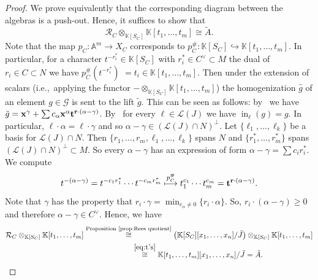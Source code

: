 \documentclass[pdftex]{sigma}%
\numberwithin{equation}{section}
\DeclareMathOperator{\init}{in}
\begin{document}
\begin{proof}
We prove equivalently that the corresponding diagram between the algebras is a push-out.
Hence, it suffices to show that
\begin{equation*}%
\mathcal R_C\otimes_{\mathbb K[S_C]} \mathbb K[t_1,\dots,t_m]\cong \tilde A.
\end{equation*}
Note that the map $p_C\colon \mathbb A^m \to X_C$ corresponds to $p_C^\#\colon \mathbb K[S_C] {\hookrightarrow} \mathbb K[t_1,\dots,t_m]$.
In particular, for a character $t^{-r_i^*}\in \mathbb K[S_C]$ with $r_i^*\in C^\vee\subset M$ the dual of $r_i\in C\subset N$ we have $p_C^\#(t^{-r_i^*})$ $=t_i\in \mathbb K[t_1,\dots,t_m]$.
Then under the extension of scalars (i.e.,~applying the functor $-\otimes_{\mathbb K[S_C]}\mathbb K[t_1,\dots,t_m]$) the homogenization $\hat g$ of an element $g\in \mathcal G$ is sent to the lift $\tilde g$.
This can be seen as follows:
by~ we have
$\tilde g={\bf x}^\gamma + \sum c_\alpha{\bf x}^\alpha{\bf t}^{{\bf r}\cdot(\alpha-\gamma)}$.
By~ for every $\ell\in \mathcal L(J)$ we have $\init_{\ell}(g)=g$.
In particular, $\ell\cdot \alpha=\ell\cdot \gamma$ and so $\alpha-\gamma\in (\mathcal L(J)\cap N)^\perp$.
Let $\{\ell_1,\dots,\ell_{k}\}$ be a basis for $\mathcal L(J)\cap N$.
Then $\{r_1,\dots,r_m,\ell_1,\dots,\ell_{k}\}$ spans $N$ and $\{r_1^*,\dots,r_m^*\}$ spans $(\mathcal L(J)\cap N)^\perp\subset M$.
So every $\alpha-\gamma$ has an expression of form $\alpha-\gamma=\sum c_ir_i^*$.
We compute
\begin{equation}\label{eq:t's}
t^{-(\alpha-\gamma)}=t^{-c_1r_1^*}\cdots t^{-c_mr_m^*} \overset{p_C^\#}{\longmapsto} t_1^{c_1}\cdots t_m^{c_m}={\bf t}^{{\bf r}\cdot(\alpha-\gamma)}.
\end{equation}
Note that $\gamma$ has the property that $r_i\cdot\gamma
=\min_{c_\alpha \not=0}\{r_i\cdot\alpha\}$.
So, $r_i\cdot(\alpha-\gamma)\ge 0$ and therefore $\alpha-\gamma\in C^\vee$.
Hence, we have
\begin{gather*}
\mathcal R_C\otimes_{\mathbb K[S_C]} \mathbb K[t_1,\dots,t_m]
\overset{\text{{Proposition}~\ref{prop:Rees quotient}}}{\cong}
\big(\mathbb K[S_C][x_1,\dots,x_n]/\hat J \big)\otimes_{\mathbb K[S_C]} \mathbb K[t_1,\dots,t_m]
\\ \hphantom{\mathcal R_C\otimes_{\mathbb K[S_C]} \mathbb K[t_1,\dots,t_m]Pro}
{}\overset{\eqref{eq:t's}}{\cong}
\mathbb K[t_1,\dots,t_m][x_1,\dots,x_n]/\tilde J=\tilde A.
\tag*{\qed}
\end{gather*}
\renewcommand{\qed}{}
\end{proof}
\end{document}
